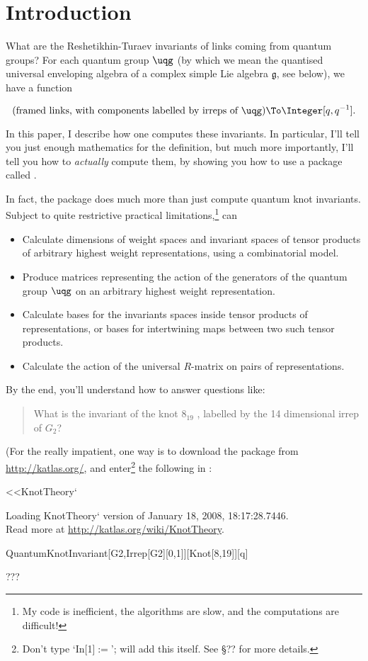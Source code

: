 \section{Introduction}
What are the Reshetikhin-Turaev invariants \cite{???} of links coming
from quantum groups? For each quantum group $\uqg$ (by which we mean the
quantised universal enveloping algebra of a complex simple Lie algebra
$\mathfrak{g}$, see below), we have a function

$$(\text{framed links, with components labelled by irreps of $\uqg$}) \To
\Integer[q,q^{-1}].$$

In this paper, I describe how one computes these invariants. In
particular, I'll tell you just enough mathematics for the definition, but
much more importantly, I'll tell you how to \emph{actually} compute them,
by showing you how to use a \MMA package called .

In fact, the package does much more than just compute quantum knot
invariants. Subject to quite restrictive practical
limitations,\footnote{My code is inefficient, the algorithms are slow,
and the computations are difficult!}  can
\begin{itemize}
\item Calculate dimensions of weight spaces and invariant spaces of
tensor products of arbitrary highest weight representations, using a
combinatorial model.
\item Produce matrices representing the action of the generators of the quantum group
$\uqg$ on an arbitrary highest weight representation.
\item Calculate bases for the invariants spaces inside tensor
products of representations, or bases for intertwining maps between two
such tensor products.
\item Calculate the action of the universal $R$-matrix on pairs of
representations.
\end{itemize}

By the end, you'll understand how to answer questions like:
\begin{quote}
What is the invariant of the knot $8_{19}$ , labelled by
the 14 dimensional irrep of $G_2$?
\end{quote}
(For the really impatient, one way is to download the 
\MMA package from \url{http://katlas.org/}, and enter\footnote{Don't type `{\color{blue}In[1]$:=$}'; \MMA will add this itself. See \S ?? for more details.} the following in \MMA:
\begin{mma}
\begin{inm}<<KnotTheory`\end{inm}
\begin{printm}Loading KnotTheory` version of January 18, 2008, 18:17:28.7446. \\
Read more at \url{http://katlas.org/wiki/KnotTheory}.
\end{printm}
\begin{inm}QuantumKnotInvariant[G2,Irrep[G2][{0,1}]][Knot[8,19]][q]\end{inm}
\begin{outm}???\end{outm}
\end{mma}


